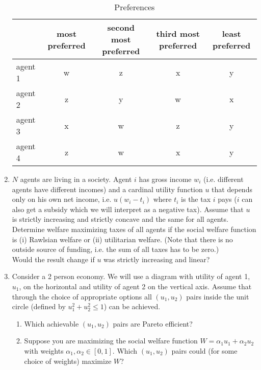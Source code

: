 \documentclass[a4paper,12pt]{article}
\begin{document}
\begin{enumerate}
  \begin{table}[h]
    \centering
    \begin{tabular}{l|cccc}
        &most preferred& second most preferred& third most preferred& least preferred\\ \hline
      agent 1& w&z & x & y\\
      agent 2& z&y&w&x\\
      agent 3& x & w & z & y\\
      agent 4& z& w&x& y \\
    \end{tabular}
    \caption{Preferences}
    \label{tab:singlePeaked}
  \end{table}
\item $N$ agents are living in a society. Agent $i$ has gross income $w_i$ (i.e. different agents have different incomes) and a cardinal utility function $u$ that depends only on his own net income, i.e. $u(w_i-t_i)$ where $t_i$ is the tax $i$ pays ($i$ can also get a subsidy which we will interpret as a negative tax). Assume that $u$ is strictly increasing and strictly concave and the same for all agents. Determine welfare maximizing taxes of all agents if the social welfare function is (i) Rawlsian welfare or (ii) utilitarian welfare. (Note that there is no outside source of funding, i.e. the sum of all taxes has to be zero.)\\
  Would the result change if $u$ was strictly increasing and linear?
\item Consider a 2 person economy. We will use a diagram with utility of agent 1, $u_1$, on the horizontal and utility of agent 2 on the vertical axis. Assume that through the choice of appropriate options all $(u_1,u_2)$ pairs inside the unit circle (defined by $u_1^2+u_2^2\leq 1$) can be achieved.
  \begin{enumerate}
  \item Which achievable $(u_1,u_2)$ pairs are Pareto efficient?
  \item Suppose you are maximizing the social welfare function $W=\alpha_1u_1+\alpha_2u_2$ with weights $\alpha_1,\alpha_2\in[0,1]$. Which $(u_1,u_2)$ pairs could (for some choice of weights) maximize $W$?

\end{enumerate}
\end{enumerate}
\end{document}
